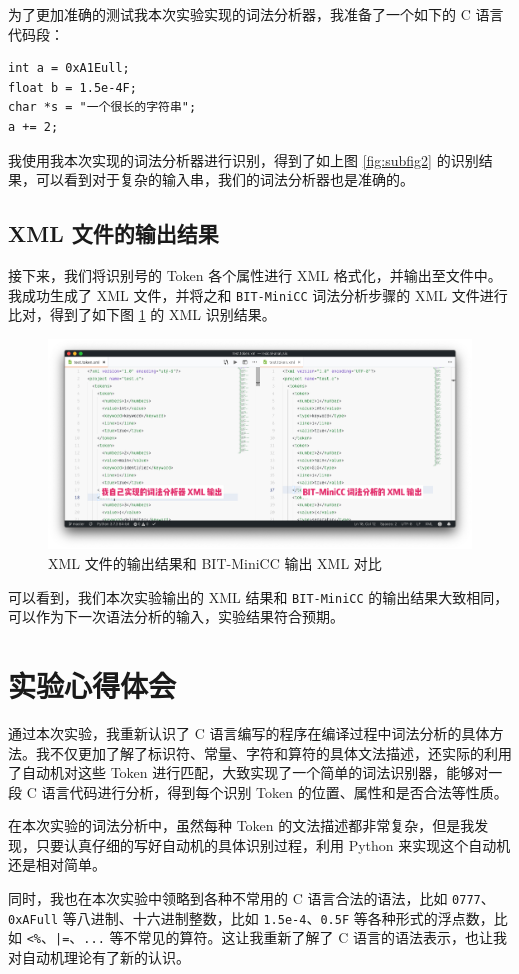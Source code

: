 \documentclass[UTF8]{ctexart}
\begin{document}
为了更加准确的测试我本次实验实现的词法分析器，我准备了一个如下的 C 语言代码段：

\begin{verbatim}
int a = 0xA1Eull;
float b = 1.5e-4F;
char *s = "一个很长的字符串";
a += 2;
\end{verbatim}

我使用我本次实现的词法分析器进行识别，得到了如上图 \ref{fig:subfig2} 的识别结果，可以看到对于复杂的输入串，我们的词法分析器也是准确的。

\subsection{XML 文件的输出结果}

接下来，我们将识别号的 Token 各个属性进行 XML 格式化，并输出至文件中。我成功生成了 XML 文件，并将之和 \texttt{BIT-MiniCC} 词法分析步骤的 XML 文件进行比对，得到了如下图 \ref{fig:figure7} 的 XML 识别结果。

\begin{figure}[h]
  \centering
  \includegraphics[width=\linewidth]{images/XML.png}
  \caption{XML 文件的输出结果和 BIT-MiniCC 输出 XML 对比}
  \label{fig:figure7}
\end{figure}

可以看到，我们本次实验输出的 XML 结果和 \texttt{BIT-MiniCC} 的输出结果大致相同，可以作为下一次语法分析的输入，实验结果符合预期。

\section{实验心得体会}
通过本次实验，我重新认识了 C 语言编写的程序在编译过程中词法分析的具体方法。我不仅更加了解了标识符、常量、字符和算符的具体文法描述，还实际的利用了自动机对这些 Token 进行匹配，大致实现了一个简单的词法识别器，能够对一段 C 语言代码进行分析，得到每个识别 Token 的位置、属性和是否合法等性质。

在本次实验的词法分析中，虽然每种 Token 的文法描述都非常复杂，但是我发现，只要认真仔细的写好自动机的具体识别过程，利用 Python 来实现这个自动机还是相对简单。

同时，我也在本次实验中领略到各种不常用的 C 语言合法的语法，比如 \texttt{0777}、\texttt{0xAFull} 等八进制、十六进制整数，比如 \texttt{1.5e-4}、\texttt{0.5F} 等各种形式的浮点数，比如 \texttt{<\%}、\texttt{|=}、\texttt{...} 等不常见的算符。这让我重新了解了 C 语言的语法表示，也让我对自动机理论有了新的认识。
\end{document}
